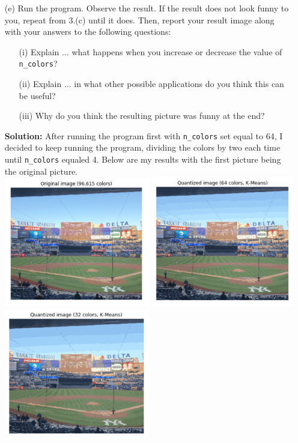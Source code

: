\documentclass[a4paper]{article}
\begin{document}
\begin{itemize}
    \item[(e)] Run the program. Observe the result.  If the result does not look funny to you, 
    repeat from 3.(c) until it does. Then, report your result image along with your answers to 
    the following questions:
    \begin{itemize}
        \item[(i)] Explain $\ldots$ what happens when you increase or decrease the value of 
        \verb|n_colors|?
        \item[(ii)] Explain $\ldots$ in what other possible applications do you think this 
        can be useful?
        \item[(iii)] Why do you think the resulting picture was funny at the end?
    \end{itemize}

    \textbf{Solution:} After running the program first with \verb|n_colors| set equal to 64, 
    I decided to keep running the program, dividing the colors by two each time until \verb|n_colors| 
    equaled 4.  Below are my results with the first picture being the original picture.\\
    \includegraphics[width=0.5\textwidth]{original.jpg}
    \includegraphics[width=0.49\textwidth]{64colors.jpg}\\
    \includegraphics[width=0.5\textwidth]{32colors.jpg}

\end{itemize}
\end{document}
